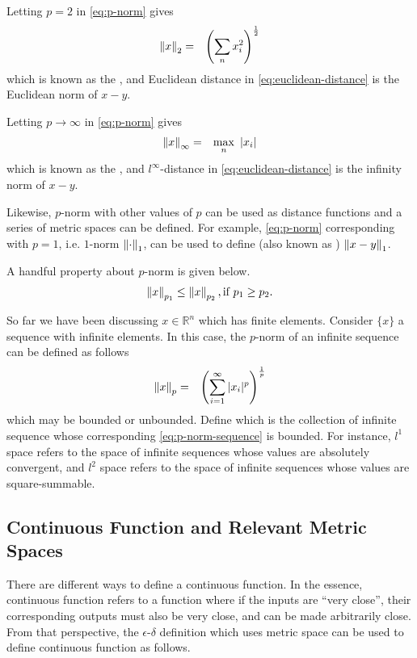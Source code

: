 Letting $p=2$ in \eqref{eq:p-norm} gives
\begin{eqnarray}
	\left\lVert x\right\rVert_2 &=& \left(\sum_n x_i^2\right)^{\frac{1}{2}} \nonumber
\end{eqnarray}
which is known as the , and Euclidean distance in \eqref{eq:euclidean-distance} is the Euclidean norm of $x-y$.

Letting $p\rightarrow \infty$ in \eqref{eq:p-norm} gives
\begin{eqnarray}
	\left\lVert x\right\rVert_{\infty} &=& \max_n ~ |x_i| \nonumber
\end{eqnarray}
which is known as the , and $l^\infty$-distance in \eqref{eq:euclidean-distance} is the infinity norm of $x-y$. 

Likewise, $p$-norm with other values of $p$ can be used as distance functions and a series of metric spaces can be defined. For example, \eqref{eq:p-norm} corresponding with $p=1$, i.e. $1$-norm $\left\lVert\cdot\right\rVert_1$, can be used to define  (also known as ) $\left\lVert x-y\right\rVert_1$.

A handful property about $p$-norm is given below.
\begin{eqnarray}
	\left\lVert x\right\rVert_{p_1} \leq \left\lVert x\right\rVert_{p_2}, \textup{if}~p_1 \geq p_2. \nonumber 
\end{eqnarray}

So far we have been discussing $x\in \mathbb{R}^n$ which has finite elements. Consider $\{x\}$ a sequence with infinite elements. In this case, the $p$-norm of an infinite sequence can be defined as follows
\begin{eqnarray}
	\left\lVert x\right\rVert_p &=& \left(\sum_{i=1}^{\infty} |x_i|^p\right)^{\frac{1}{p}} \label{eq:p-norm-sequence}
\end{eqnarray}
which may be bounded or unbounded. Define  which is the collection of infinite sequence whose corresponding \eqref{eq:p-norm-sequence} is bounded. For instance, $l^1$ space refers to the space of infinite sequences whose values are absolutely convergent, and $l^2$ space refers to the space of infinite sequences whose values are square-summable.

\subsection{Continuous Function and Relevant Metric Spaces} \label{sec:continuous-function}

There are different ways to define a continuous function. In the essence, continuous function refers to a function where if the inputs are ``very close'', their corresponding outputs must also be very close, and can be made arbitrarily close. From that perspective, the $\epsilon$-$\delta$ definition which uses metric space can be used to define continuous function as follows. 

